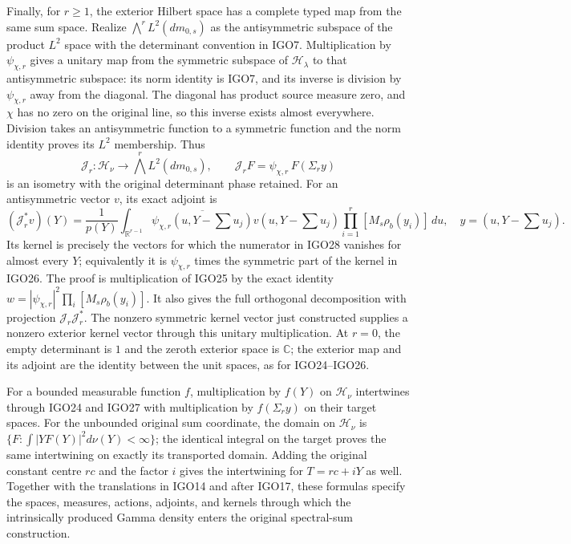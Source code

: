 Finally, for $r\geq1$, the exterior Hilbert space has a complete typed map
from the same sum space. Realize $\bigwedge^rL^2(dm_{0,s})$
as the antisymmetric subspace of the product $L^2$ space with
the determinant convention in IGO7. Multiplication by
$\psi_{\chi,r}$ gives a unitary map from the symmetric
subspace of $\mathcal H_\lambda$ to that antisymmetric
subspace: its norm identity is IGO7, and its inverse is
division by $\psi_{\chi,r}$ away from the diagonal. The
diagonal has product source measure zero, and $\chi$ has
no zero on the original line, so this inverse exists almost
everywhere. Division takes an antisymmetric function to a
symmetric function and the norm identity proves its $L^2$
membership. Thus
\[
 \mathcal J_r:\mathcal H_\nu\longrightarrow
                  \bigwedge^r L^2(dm_{0,s}),\qquad
 \mathcal J_rF=\psi_{\chi,r}\,F(\Sigma_r y)
 \tag{IGO27}
\]
is an isometry with the original determinant phase retained.
For an antisymmetric vector $v$, its exact adjoint is
\[
 (\mathcal J_r^*v)(Y)=\frac1{p(Y)}
 \int_{\mathbb R^{r-1}}
   \overline{\psi_{\chi,r}(u,Y-\textstyle\sum u_j)}
   v(u,Y-\textstyle\sum u_j)
   \prod_{i=1}^r[M_s\rho_b(y_i)]\,du,
 \quad y=(u,Y-\textstyle\sum u_j).
 \tag{IGO28}
\]
Its kernel is precisely the vectors for which the numerator
in IGO28 vanishes for almost every $Y$; equivalently it is
$\psi_{\chi,r}$ times the symmetric part of the kernel in
IGO26. The proof is multiplication of IGO25 by the exact
identity $w=|\psi_{\chi,r}|^2\prod_i[M_s\rho_b(y_i)]$.
It also gives the full orthogonal decomposition with
projection $\mathcal J_r\mathcal J_r^*$. The nonzero
symmetric kernel vector just constructed supplies a nonzero
exterior kernel vector through this unitary multiplication.
At $r=0$, the empty determinant is $1$ and the zeroth exterior
space is $\mathbb C$; the exterior map and its adjoint are the
identity between the unit spaces, as for IGO24--IGO26.

For a bounded measurable function $f$, multiplication by
$f(Y)$ on $\mathcal H_\nu$ intertwines through IGO24 and
IGO27 with multiplication by $f(\Sigma_r y)$ on their
target spaces. For the unbounded original sum coordinate,
the domain on $\mathcal H_\nu$ is
$\{F:\int |YF(Y)|^2d\nu(Y)<\infty\}$; the identical
integral on the target proves the same intertwining on
exactly its transported domain. Adding the original
constant centre $rc$ and the factor $i$ gives the
intertwining for $T=rc+iY$ as well. Together with the
translations in IGO14 and after IGO17, these formulas
specify the spaces, measures, actions, adjoints, and kernels
through which the intrinsically produced Gamma density
enters the original spectral-sum construction.
